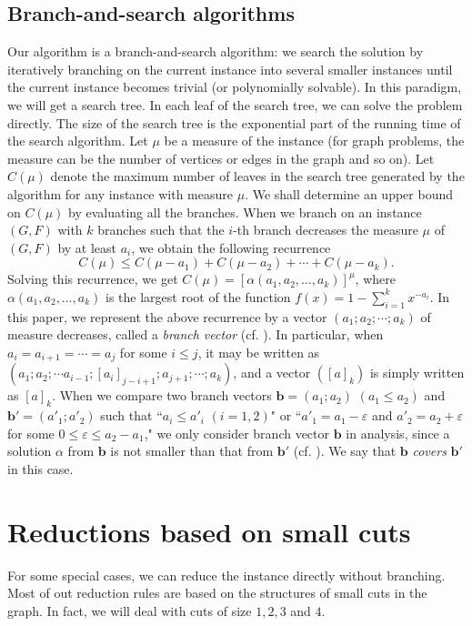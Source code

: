 \documentclass[runningheads]{llncs}
\begin{document}
\subsection{Branch-and-search algorithms}
Our algorithm is a branch-and-search algorithm: we search the solution by iteratively branching on the current
instance into several smaller instances until the current instance becomes trivial (or polynomially solvable).
In this paradigm, we will get a search tree. In each leaf of the search tree, we can solve the problem directly.
The size of the search tree is the exponential part of the running time of the search algorithm.
Let $\mu$ be a measure of the instance (for graph problems, the measure can be the number of vertices or edges in the graph and so on). Let $C(\mu)$ denote the maximum number of leaves in the search tree
generated by the algorithm for any instance with measure $\mu$.
We shall determine an upper bound on $C(\mu)$ by evaluating all the branches.
When we branch on an instance $(G,F)$ with $k$ branches such that
the $i$-th branch decreases the measure $\mu$ of $(G,F)$ by
at least $a_i$, we obtain the following recurrence
$$C(\mu)\leq  C(\mu-a_1)+C(\mu-a_2)+\cdots +C(\mu-a_k).$$
Solving this recurrence, we get $C(\mu)=[\alpha(a_1, a_2, \ldots,
a_k)]^\mu$, where $\alpha(a_1, a_2, \ldots, a_k)$ is the largest
root of the function $f(x)=1-\sum_{i=1}^k x^{-a_i}$.
In this paper, we represent the above recurrence by a vector
$(a_1;a_2;\cdots ; a_k)$ of measure decreases, called a {\em branch vector}
(cf. \cite{Fomin:book}).
In particular, when $a_i=a_{i+1}=\cdots=a_j$ for some $i\leq j$,
it may be written as
$(a_1;a_2;\cdots a_{i-1};[a_i]_{j-i+1};a_{j+1}; \cdots ; a_k)$,
and a vector $([a]_k)$ is simply written as $[a]_k$.
When we compare two branch vectors $\mathbf{b}=(a_1;a_2)$ $(a_1\leq a_2)$
and $\mathbf{b}'=(a'_1;a'_2)$ such that ``$a_i\leq a'_i$ $(i=1,2)$" or ``$a'_1=a_1-\varepsilon$ and
$a'_2=a_2+\varepsilon$ for some $0\leq \varepsilon\leq a_2-a_1$,"
we only consider branch vector $\mathbf{b}$ in analysis,
since a solution $\alpha$ from  $\mathbf{b}$ is not
smaller than that from $\mathbf{b}'$ (cf. \cite{Fomin:book}).
We say that  $\mathbf{b}$ {\em covers} $\mathbf{b}'$ in this case.


\section{Reductions based on small cuts}
For some special cases, we can reduce the instance directly without branching.
Most of out reduction rules are based on the structures of small cuts in the graph.
In fact, we will deal with cuts of size $1,2,3$ and $4$.
\end{document}
